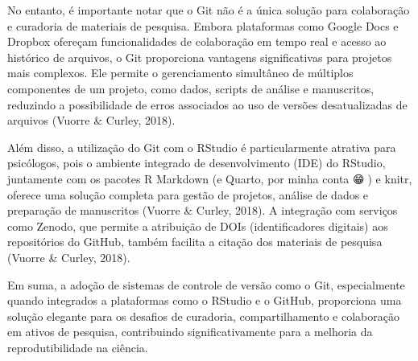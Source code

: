 \documentclass[
  a4paper,
]{article}
\begin{document}
\begin{tcolorbox}
No entanto, é importante notar que o Git não é a única solução para
colaboração e curadoria de materiais de pesquisa. Embora plataformas
como Google Docs e Dropbox ofereçam funcionalidades de colaboração em
tempo real e acesso ao histórico de arquivos, o Git proporciona
vantagens significativas para projetos mais complexos. Ele permite o
gerenciamento simultâneo de múltiplos componentes de um projeto, como
dados, scripts de análise e manuscritos, reduzindo a possibilidade de
erros associados ao uso de versões desatualizadas de arquivos (Vuorre \&
Curley, 2018).

Além disso, a utilização do Git com o RStudio é particularmente atrativa
para psicólogos, pois o ambiente integrado de desenvolvimento (IDE) do
RStudio, juntamente com os pacotes R Markdown (e Quarto, por minha conta
😁🤣) e knitr, oferece uma solução completa para gestão de projetos,
análise de dados e preparação de manuscritos (Vuorre \& Curley, 2018). A
integração com serviços como Zenodo, que permite a atribuição de DOIs
(identificadores digitais) aos repositórios do GitHub, também facilita a
citação dos materiais de pesquisa (Vuorre \& Curley, 2018).

Em suma, a adoção de sistemas de controle de versão como o Git,
especialmente quando integrados a plataformas como o RStudio e o GitHub,
proporciona uma solução elegante para os desafios de curadoria,
compartilhamento e colaboração em ativos de pesquisa, contribuindo
significativamente para a melhoria da reprodutibilidade na ciência.

\end{tcolorbox}
\end{document}
